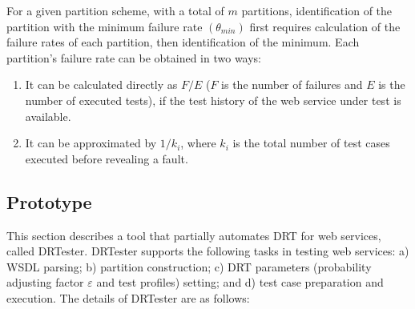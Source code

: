 \documentclass[10pt,journal,compsoc]{IEEEtran}
\begin{document}
For a given partition scheme, with a total of $m$ partitions, identification of the partition with the minimum failure rate $(\theta_{min})$ first requires calculation of the failure rates of each partition, then identification of the minimum. Each partition's failure rate can be obtained in two ways:
\begin{enumerate}[1)]
  \item
  It can be calculated directly as $F / E$ ($F$ is the number of failures and $E$ is the number of executed tests), if the test history of the web service under test is available.

  \item
  It can be approximated by $1 / k_i$, where $k_i$ is the total number of test cases executed before revealing a fault.
\end{enumerate}


\subsection{Prototype}
\label{sec:prototype}

This section describes a tool that partially automates DRT for web services, called DRTester. DRTester supports the following tasks in testing web services: a) WSDL parsing; b) partition construction; c) DRT parameters (probability adjusting factor $\varepsilon$ and test profiles) setting; and d) test case preparation and execution. The details of DRTester are as follows:
\end{document}
